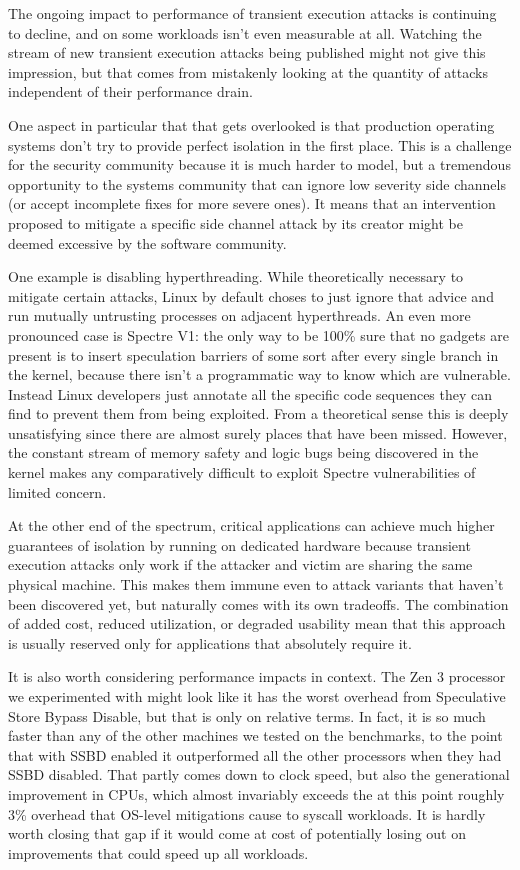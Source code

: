 \label{s:discussion}
The ongoing impact to performance of transient execution attacks is continuing to decline, and on some workloads isn't even measurable at all.
Watching the stream of new transient execution attacks being published might not give this impression, but that comes from mistakenly looking at the quantity of attacks independent of their performance drain.

One aspect in particular that that gets overlooked is that production operating systems don't try to provide perfect isolation in the first place.
This is a challenge for the security community because it is much harder to model, but a tremendous opportunity to the systems community that can ignore low severity side channels (or accept incomplete fixes for more severe ones).
It means that an intervention proposed to mitigate a specific side channel attack by its creator might be deemed excessive by the software community.

One example is disabling hyperthreading.
While theoretically necessary to mitigate certain attacks, Linux by default choses to just ignore that advice and run mutually untrusting processes on adjacent hyperthreads.
An even more pronounced case is Spectre V1: the only way to be 100\% sure that no gadgets are present is to insert speculation barriers of some sort after every single branch in the kernel, because there isn't a programmatic way to know which are vulnerable.
Instead Linux developers just annotate all the specific code sequences they can find to prevent them from being exploited.
From a theoretical sense this is deeply unsatisfying since there are almost surely places that have been missed.
However, the constant stream of memory safety and logic bugs being discovered in the kernel makes any comparatively difficult to exploit Spectre vulnerabilities of limited concern.

At the other end of the spectrum, critical applications can achieve much higher guarantees of isolation by running on dedicated hardware because transient execution attacks only work if the attacker and victim are sharing the same physical machine.
This makes them immune even to attack variants that haven't been discovered yet, but naturally comes with its own tradeoffs.
The combination of added cost, reduced utilization, or degraded usability mean that this approach is usually reserved only for applications that absolutely require it.

It is also worth considering performance impacts in context.
The Zen 3 processor we experimented with might look like it has the worst overhead from Speculative Store Bypass Disable, but that is only on relative terms.
In fact, it is so much faster than any of the other machines we tested on the benchmarks, to the point that with SSBD enabled it outperformed all the other processors when they had SSBD disabled.
That partly comes down to clock speed, but also the generational improvement in CPUs, which almost invariably exceeds the at this point roughly 3\% overhead that OS-level mitigations cause to syscall workloads.
It is hardly worth closing that gap if it would come at cost of potentially losing out on improvements that could speed up all workloads.

